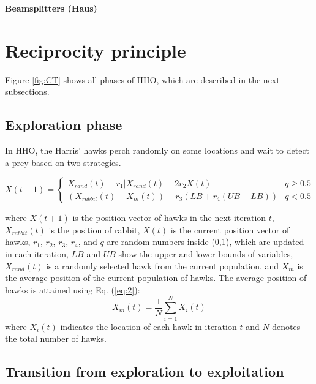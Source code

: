 \documentclass[preprint,12pt]{elsarticle}
\begin{document}
\sloppy
{\LARGE\textbf{Beamsplitters (Haus)}}
\\
\section{Reciprocity principle}
\label{s:hho}

Figure \ref{fig:CT} shows all phases of HHO, which are described in the next subsections.


\subsection{Exploration phase}

In HHO, the Harris' hawks perch randomly on some locations and wait to detect a prey based on two strategies.

\begin{equation} \label{eq:1}
X(t+1) = \left\{\begin{matrix}
X_{rand}(t)-r_{1}\left | X_{rand}(t)-2r_{2}X(t) \right |  &  q\geq 0.5   \\
(X_{rabbit}(t)-X_{m}(t))-r_{3}(LB+r_{4}(UB-LB)) &  q<0.5
\end{matrix}\right.
 \end{equation}

\noindent where $X(t+1)$ is the position vector of hawks in the next iteration $t$, $X_{rabbit}(t)$ is the position of rabbit,  $X(t)$ is the current position vector of hawks, $r_{1}$, $r_{2}$, $r_{3}$, $r_{4}$, and $q$ are random numbers inside (0,1), which are updated in each iteration, $LB$ and $UB$ show the upper and lower bounds of variables, $X_{rand}(t)$ is a randomly selected hawk from the current population, and $X_{m}$ is the average position of the current population of hawks.
The average position of hawks is attained using Eq. (\ref{eq:2}):
\begin{equation} \label{eq:2}
X_{m}(t)=\frac{1}{N}\sum_{i=1}^{N}X_{i}(t)
\end{equation}
where $X_{i}(t)$ indicates the location of each hawk in iteration $t$ and $N$ denotes the total number of hawks.

\subsection{Transition from exploration to exploitation}
\end{document}
